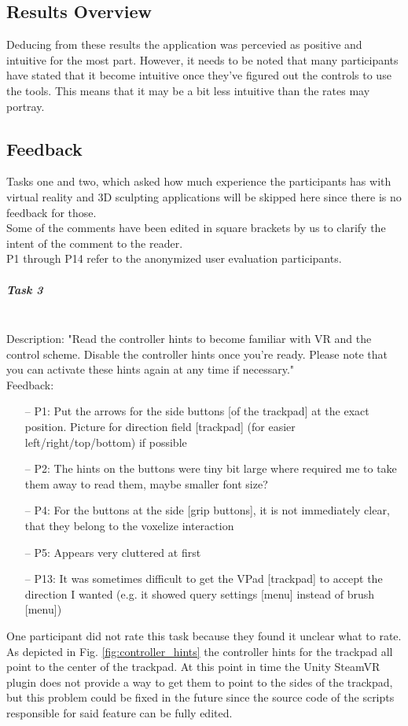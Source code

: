 \subsection{Results Overview}


Deducing from these results the application was percevied as positive and intuitive for the most part. However, it needs to be noted that many participants have stated that it become intuitive once they've figured out the controls to use
the tools. This means that it may be a bit less intuitive than the rates may portray.

\subsection{Feedback}

Tasks one and two, which asked how much experience the participants has with virtual reality and 3D sculpting applications will be skipped here since there is no feedback for those.\\
Some of the comments have been edited in square brackets by us to clarify the intent of the comment to the reader.\\
P1 through P14 refer to the anonymized user evaluation participants.

\subparagraph{Task 3} \hfill \\
Description: "Read the controller hints to become familiar with VR and the control scheme. Disable the controller hints once you're ready. Please note that you can activate these hints
again at any time if necessary."\\
Feedback:
\begin{itemize} \setlength\itemsep{-0.5em}
	\item[--] P1: Put the arrows for the side buttons [of the trackpad] at the exact position. Picture for direction field [trackpad] (for easier left/right/top/bottom) if possible
	\item[--] P2: The hints on the buttons were tiny bit large where required me to take them away to read them, maybe smaller font size?
	\item[--] P4: For the buttons at the side [grip buttons], it is not immediately clear, that they belong to the voxelize interaction
	\item[--] P5: Appears very cluttered at first
	\item[--] P13: It was sometimes difficult to get the VPad [trackpad] to accept the direction I wanted (e.g. it showed query settings [menu] instead of brush [menu])
\end{itemize}
One participant did not rate this task because they found it unclear what to rate.\\
As depicted in Fig. \ref{fig:controller_hints} the controller hints for the trackpad all point to the center of the trackpad. At this point in time the Unity SteamVR plugin does not provide a way to get them to point to the sides of the trackpad, but this problem could be fixed in the future since the source code of the scripts responsible for said feature can be fully edited.

